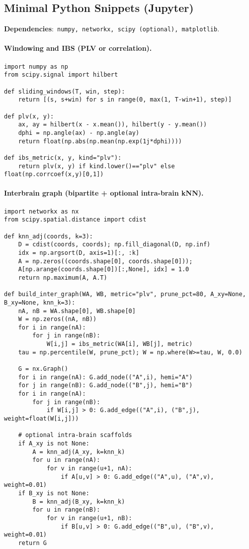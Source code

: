 \documentclass{article}
\theoremstyle{definition}
\begin{document}
\subsection{Minimal Python Snippets (Jupyter)}
\textbf{Dependencies}:\ \texttt{numpy, networkx, scipy (optional), matplotlib}.

\paragraph{Windowing and IBS (PLV or correlation).}
\begin{verbatim}
import numpy as np
from scipy.signal import hilbert

def sliding_windows(T, win, step):
    return [(s, s+win) for s in range(0, max(1, T-win+1), step)]

def plv(x, y):
    ax, ay = hilbert(x - x.mean()), hilbert(y - y.mean())
    dphi = np.angle(ax) - np.angle(ay)
    return float(np.abs(np.mean(np.exp(1j*dphi))))

def ibs_metric(x, y, kind="plv"):
    return plv(x, y) if kind.lower()=="plv" else float(np.corrcoef(x,y)[0,1])
\end{verbatim}

\paragraph{Interbrain graph (bipartite + optional intra-brain kNN).}
\begin{verbatim}
import networkx as nx
from scipy.spatial.distance import cdist

def knn_adj(coords, k=3):
    D = cdist(coords, coords); np.fill_diagonal(D, np.inf)
    idx = np.argsort(D, axis=1)[:, :k]
    A = np.zeros((coords.shape[0], coords.shape[0])); 
    A[np.arange(coords.shape[0])[:,None], idx] = 1.0
    return np.maximum(A, A.T)

def build_inter_graph(WA, WB, metric="plv", prune_pct=80, A_xy=None, B_xy=None, knn_k=3):
    nA, nB = WA.shape[0], WB.shape[0]
    W = np.zeros((nA, nB))
    for i in range(nA):
        for j in range(nB):
            W[i,j] = ibs_metric(WA[i], WB[j], metric)
    tau = np.percentile(W, prune_pct); W = np.where(W>=tau, W, 0.0)

    G = nx.Graph()
    for i in range(nA): G.add_node(("A",i), hemi="A")
    for j in range(nB): G.add_node(("B",j), hemi="B")
    for i in range(nA):
        for j in range(nB):
            if W[i,j] > 0: G.add_edge(("A",i), ("B",j), weight=float(W[i,j]))

    # optional intra-brain scaffolds
    if A_xy is not None:
        A = knn_adj(A_xy, k=knn_k)
        for u in range(nA):
            for v in range(u+1, nA):
                if A[u,v] > 0: G.add_edge(("A",u), ("A",v), weight=0.01)
    if B_xy is not None:
        B = knn_adj(B_xy, k=knn_k)
        for u in range(nB):
            for v in range(u+1, nB):
                if B[u,v] > 0: G.add_edge(("B",u), ("B",v), weight=0.01)
    return G
\end{verbatim}
\end{document}
